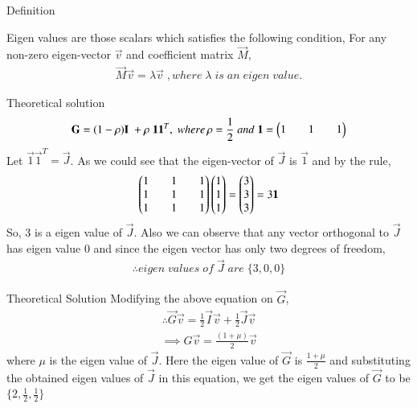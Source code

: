 \documentclass{beamer}
\begin{document}
\begin{frame}{Definition}

Eigen values are those scalars which satisfies the following condition,
For any non-zero eigen-vector $\vec{v}$ and coefficient matrix $\vec{M}$,
\begin{align*}
    \vec{M}\vec{v}=\lambda \vec{v} \; , where \; \lambda \;is\; an \;eigen\; value.
\end{align*}
\end{frame}

\begin{frame}{Theoretical solution}
\begin{align*}
     \mathbf{G}=(1-\rho)\mathbf{I}\;+\rho\;\mathbf{1}\mathbf{1}^T, \; where\, \rho=\frac{1}{2}\;and\;\mathbf{1}=\begin{pmatrix}1&&1&&1\end{pmatrix}
\end{align*}
Let $\vec{1}\vec{1}^T=\vec{J}$. As we could see that the eigen-vector of $\vec{J}$ is $\vec{1}$ and by the rule,
\begin{align*}
    \begin{pmatrix}1&&1&&1\\1&&1&&1\\1&&1&&1\end{pmatrix}\begin{pmatrix}1\\1\\1\end{pmatrix}=\begin{pmatrix}3\\3\\3\end{pmatrix}=3\mathbf{1}
\end{align*}
So, 3 is a eigen value of $\vec{J}$. Also we can observe that any vector orthogonal to $\vec{J}$ has eigen value 0 and since the eigen vector has only two degrees of freedom,
\begin{align*}
    \therefore eigen\;values\;of\;\vec{J}\;are\;\{3,0,0\}
\end{align*}
\end{frame}

\begin{frame}{Theoretical Solution}
Modifying the above equation on $\vec{G}$,
\begin{align*}
    \therefore \vec{G}\vec{v}=\frac{1}{2}\vec{I}\vec{v}+\frac{1}{2}\vec{J}\vec{v}
\end{align*}
\begin{align*}
    \implies G\vec{v}=\frac{(1+\mu)}{2}\vec{v}
\end{align*}
where $\mu$ is the eigen value of $\vec{J}$. Here the eigen value of $\vec{G}$ is $\frac{1+\mu}{2}$ and substituting the obtained eigen values of $\vec{J}$ in this equation, we get the eigen values of $\vec{G}$ to be $\{2,\frac{1}{2},\frac{1}{2}\}$
\end{frame}
\end{document}
